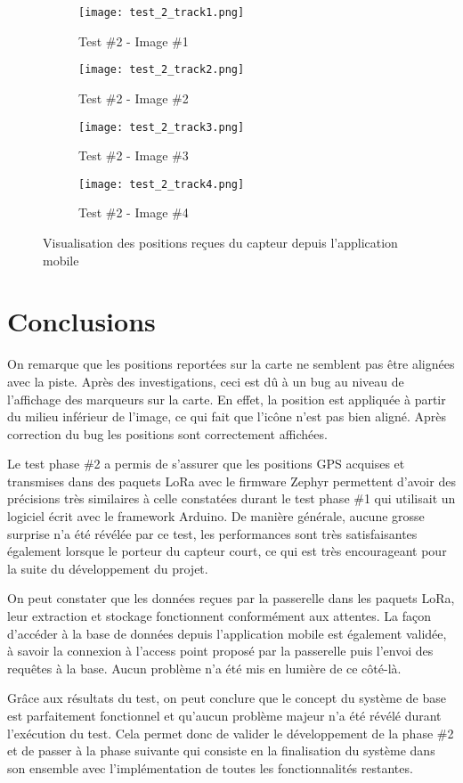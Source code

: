\begin{figure}[htb]
\centering
\begin{subfigure}{.5\textwidth}
  \centering
  \texttt{[image: test\_2\_track1.png]}
  \caption{Test \#2 - Image \#1}
  \label{fig:test_2_track1}
\end{subfigure}%
\begin{subfigure}{.5\textwidth}
  \centering
  \texttt{[image: test\_2\_track2.png]}
  \caption{Test \#2 - Image \#2}
  \label{fig:test_2_track2}
\end{subfigure}
\begin{subfigure}{.5\textwidth}
  \centering
  \texttt{[image: test\_2\_track3.png]}
  \caption{Test \#2 - Image \#3}
  \label{fig:test_2_track3}
\end{subfigure}%
\begin{subfigure}{.5\textwidth}
  \centering
  \texttt{[image: test\_2\_track4.png]}
  \caption{Test \#2 - Image \#4}
  \label{fig:test_2_track4}
\end{subfigure}
\caption{Visualisation des positions reçues du capteur depuis l'application mobile}
\label{fig:test_2}
\end{figure}

\section{Conclusions}

On remarque que les positions reportées sur la carte ne semblent pas être alignées avec la piste. Après des investigations, ceci est dû à un bug au niveau de l'affichage des marqueurs sur la carte. En effet, la position est appliquée à partir du milieu inférieur de l'image, ce qui fait que l'icône n'est pas bien aligné. Après correction du bug les positions sont correctement affichées.

Le test phase \#2 a permis de s'assurer que les positions GPS acquises et transmises dans des paquets LoRa avec le firmware Zephyr permettent d'avoir des précisions très similaires à celle constatées durant le test phase \#1 qui utilisait un logiciel écrit avec le framework Arduino. De manière générale, aucune grosse surprise n’a été révélée par ce test, les performances sont très satisfaisantes également lorsque le porteur du capteur court, ce qui est très encourageant pour la suite du développement du projet.

On peut constater que les données reçues par la passerelle dans les paquets LoRa, leur extraction et stockage fonctionnent conformément aux attentes. La façon d'accéder à la base de données depuis l'application mobile est également validée, à savoir la connexion à l'access point proposé par la passerelle puis l’envoi des requêtes à la base. Aucun problème n’a été mis en lumière de ce côté-là.

Grâce aux résultats du test, on peut conclure que le concept du système de base est parfaitement fonctionnel et qu'aucun problème majeur n’a été révélé durant l'exécution du test. Cela permet donc de valider le développement de la phase \#2 et de passer à la phase suivante qui consiste en la finalisation du système dans son ensemble avec l'implémentation de toutes les fonctionnalités restantes.
